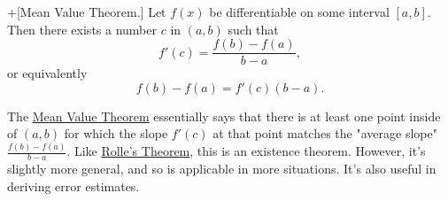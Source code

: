 \documentclass[10pt,]{book}
\theoremstyle{ptxplainnotitle}
\theoremstyle{ptxplaintitle}
\theoremstyle{ptxplainnotitle}
\theoremstyle{ptxplaintitle}
\theoremstyle{ptxplainnotitle}
\theoremstyle{ptxplaintitle}
\theoremstyle{ptxdefinitionnotitle}
\theoremstyle{ptxdefinitiontitle}
\theoremstyle{ptxdefinitionnotitle}
\theoremstyle{ptxdefinitiontitle}
\theoremstyle{ptxdefinitionnotitle}
\theoremstyle{ptxdefinitiontitle}
\theoremstyle{ptxdefinitionnotitle}
\theoremstyle{ptxdefinitiontitle}
\theoremstyle{ptxdefinitionnotitle}
\theoremstyle{ptxdefinitiontitle}
\numberwithin{equation}{section}
\begin{document}
\begin{theorem}+[{Mean Value Theorem.}]\label{theorem-mean-value-theorem}
\hypertarget{p-338}{}%
Let \(f(x)\) be differentiable on some interval \([a,b]\). Then there exists a number \(c\) in \((a,b)\) such that%
\begin{equation*}
f'(c) = \frac{f(b) - f(a)}{b-a},
\end{equation*}
or equivalently%
\begin{equation*}
f(b) - f(a) = f'(c)(b-a).
\end{equation*}
%
\end{theorem}
\hypertarget{p-339}{}%
The \hyperref[theorem-mean-value-theorem]{Mean Value Theorem} essentially says that there is at least one point inside of \((a,b)\) for which the slope \(f'(c)\) at that point matches the "average slope" \(\frac{f(b) - f(a)}{b-a}.\) Like \hyperref[theorem-rolle-s-theorem]{Rolle's Theorem}, this is an existence theorem. However, it's slightly more general, and so is applicable in more situations. It's also useful in deriving error estimates.%
\end{document}
